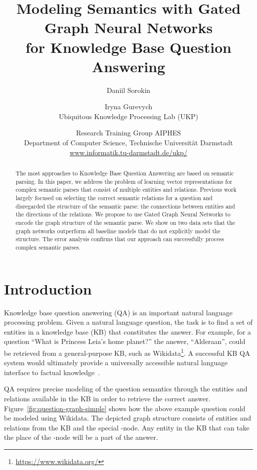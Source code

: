 \documentclass[11pt]{article}
\title{Modeling Semantics with Gated Graph Neural Networks \\ for Knowledge Base Question Answering}
\author{Daniil Sorokin \and Iryna Gurevych\\
Ubiquitous Knowledge Processing Lab (UKP) \and Research Training Group AIPHES \\
Department of Computer Science, 
Technische Universit\"at Darmstadt \\
  {\url{www.informatik.tu-darmstadt.de/ukp/}} \\ 
}
\date{}
\begin{document}
\maketitle

\begin{abstract}
The most approaches to Knowledge Base Question Answering are based on semantic parsing. In this paper, we address the problem of learning vector representations for complex semantic parses that consist of multiple entities and relations.
Previous work largely focused on selecting the correct semantic relations for a question and disregarded the structure of the semantic parse: the connections between entities and the directions of the relations.
We propose to use Gated Graph Neural Networks to encode the graph structure of the semantic parse. 
We show on two data sets that the graph networks outperform all baseline models that do not explicitly model the structure. The error analysis confirms that our approach can successfully  process complex  semantic parses.

\end{abstract}


\section{Introduction}

Knowledge base question answering (QA) is an important natural language processing problem. Given a natural language question, the task is to find a set of entities in a knowledge base (KB) that constitutes the answer. For example, for a question ``What is Princess Leia's home planet?'' the answer, ``Alderaan'', could be retrieved from a general-purpose KB, such as Wikidata\footnote{\url{https://www.wikidata.org/}}. A successful KB QA system would ultimately provide a universally accessible natural language interface to factual knowledge~\cite{Liang2016}.

QA requires precise modeling of the question semantics through the entities and relations available in the KB in order to retrieve the correct answer. Figure~\ref{fig:question-graph-simple} shows how the above example question could be modeled using Wikidata. The depicted graph structure consists of entities and relations from the KB and the special -node. Any entity in the KB that can take the place of the -node will be a part of the answer.
\end{document}
